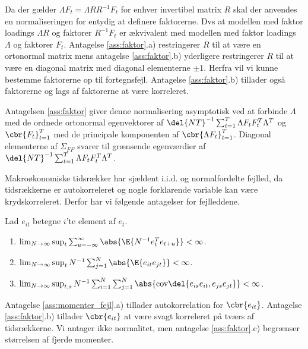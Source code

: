 %
Da der gælder  \(\Lambda F_t = \Lambda R R^{-1} F_t\) for enhver invertibel matrix \(R\) skal der anvendes en normaliseringen  for entydig at definere faktorerne.
Dvs at modellen med faktor loadings \(\Lambda R\) og faktorer \(R^{-1} F_t\) er ækvivalent med modellen med faktor loadings \(\Lambda\) og faktorer \(F_t\).
Antagelse \ref{ass:faktor}.a) restringerer \(R\) til at være en ortonormal matrix mens antagelse \ref{ass:faktor}.b) yderligere restringerer \(R\) til at være en diagonal matrix med diagonal elementerne \(\pm 1\).
Herfra vil vi kunne bestemme faktorerne op til fortegnsfejl.
Antagelse \ref{ass:faktor}.b) tillader også faktorerne og lags af faktorerne at være korreleret.

Antagelsen \ref{ass:faktor} giver denne normalisering asymptotisk ved at forbinde \(\Lambda\) med de ordnede ortonormal egenvektorer af \(\del{NT}^{-1} \sum_{t=1}^T \Lambda F_t F_t^T \Lambda^T\) og \(\cbr{F_t}_{t=1}^T\) med de principale komponenten af \(\cbr{\Lambda F_t}_{t=1}^T\).
Diagonal elementerne af \(\Sigma_{FF}\) svarer til grænsende egenværdier af \(\del{NT}^{-1} \sum_{t=1}^T \Lambda F_t F_t^T \Lambda^T\).


Makroøkonomiske tidsrækker har sjældent i.i.d. og normalfordelte fejlled, da tidsrækkerne er autokorreleret og nogle forklarende variable kan være krydskorreleret. 
Derfor har vi følgende antagelser for fejlleddene.
%
\begin{ass} \label{ass:momenter_fejl}
Lad \(e_{it}\) betegne \(i\)'te element af \(e_t\).
\begin{enumerate}[label=\alph*)]
\item \(\lim_{N \rightarrow \infty} \sup_t \sum_{u = - \infty}^\infty \abs{\E{N^{-1} e_t^T e_{t+u}}} < \infty\).
\item \(\lim_{N \rightarrow \infty} \sup_t N^{-1} \sum_{j = 1}^N \abs{\E{e_{it} e_{jt}}} < \infty\).
\item \(\lim_{N \rightarrow \infty} \sup_{t,s} N^{-1} \sum_{i=1}^N \sum_{j=1}^N \abs{\text{cov}\del{e_{is} e_{it}, e_{js} e_{jt}}} < \infty\).
\end{enumerate}
\end{ass}
%
Antagelse \ref{ass:momenter_fejl}.a) tillader autokorrelation for \(\cbr{e_{it}}\).
Antagelse \ref{ass:faktor}.b) tillader \(\cbr{e_{it}}\) at være svagt korreleret på tværs af tidsrækkerne.
Vi antager ikke normalitet, men antagelse \ref{ass:faktor}.c) begrænser størrelsen af fjerde momenter.

